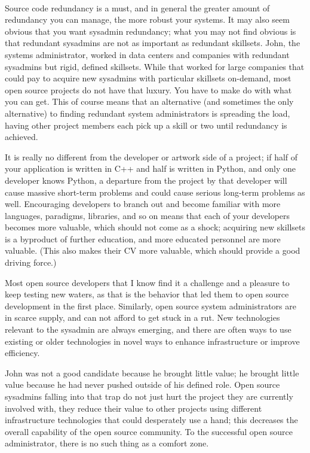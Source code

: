 \paragraph*{}Source code redundancy is a must, and in general the greater amount of
redundancy you can manage, the more robust your systems. It may also seem
obvious that you want sysadmin redundancy; what you may not find obvious is that
redundant sysadmins are not as important as redundant skillsets. John, the
systems administrator, worked in data centers and companies with redundant
sysadmins but rigid, defined skillsets. While that worked for large companies
that could pay to acquire new sysadmins with particular skillsets on-demand,
most open source projects do not have that luxury. You have to make do with what
you can get. This of course means that an alternative (and sometimes the only
alternative) to finding redundant system administrators is spreading the load,
having other project members each pick up a skill or two until redundancy is
achieved.

It is really no different from the developer or artwork side of a project; if half of
your application is written in C++ and half is written in Python, and only one
developer knows Python, a departure from the project by that developer will
cause massive short-term problems and could cause serious long-term problems as
well. Encouraging developers to branch out and become familiar with more
languages, paradigms, libraries, and so on means that each of your developers
becomes more valuable, which should not come as a shock; acquiring new skillsets
is a byproduct of further education, and more educated personnel are more
valuable. (This also makes their CV more valuable, which should provide a good driving force.)

Most open source developers that I know find it a challenge and a pleasure to
keep testing new waters, as that is the behavior that led them to open source
development in the first place. Similarly, open source system administrators are
in scarce supply, and can not afford to get stuck in a rut. New technologies
relevant to the sysadmin are always emerging, and there are often ways to use
existing or older technologies in novel ways to enhance infrastructure or
improve efficiency.

John was not a good candidate because he brought little value; he brought little
value because he had never pushed outside of his defined role. Open source
sysadmins falling into that trap do not just hurt the project they are currently
involved with, they reduce their value to other projects using different
infrastructure technologies that could desperately use a hand; this decreases
the overall capability of the open source community. To the successful open
source administrator, there is no such thing as a comfort zone.
